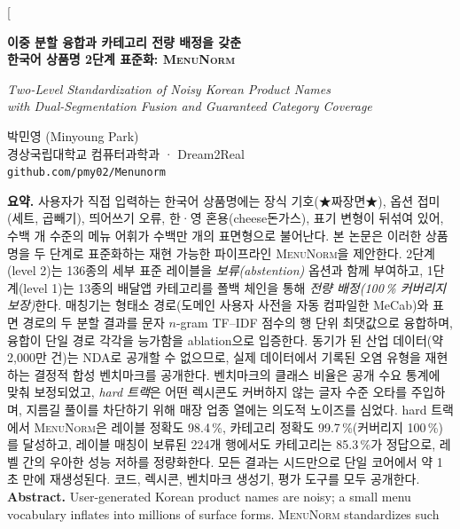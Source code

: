 \documentclass[10pt,twocolumn]{article}
\newcommand{\menunorm}{\textsc{MenuNorm}}
\begin{document}
\twocolumn[{%
\begin{center}
{\LARGE\bfseries 이중 분할 융합과 카테고리 전량 배정을 갖춘\\[2pt]
한국어 상품명 2단계 표준화: \menunorm\par}
\vspace{8pt}
{\large\itshape Two-Level Standardization of Noisy Korean Product Names\\
with Dual-Segmentation Fusion and Guaranteed Category Coverage\par}
\vspace{12pt}
{\large 박민영 (Minyoung Park)}\\[2pt]
{\small 경상국립대학교 컴퓨터과학과 \;·\; Dream2Real\\
\texttt{github.com/pmy02/Menunorm}}
\vspace{12pt}
\end{center}
\begin{center}
\begin{minipage}{0.92\textwidth}
\small
\textbf{요약.}
사용자가 직접 입력하는 한국어 상품명에는 장식 기호(\mbox{★짜장면★}),
옵션 접미(세트, 곱빼기), 띄어쓰기 오류, 한·영 혼용(\mbox{cheese돈가스}),
표기 변형이 뒤섞여 있어, 수백 개 수준의 메뉴 어휘가 수백만 개의 표면형으로
불어난다. 본 논문은 이러한 상품명을 두 단계로 표준화하는 재현 가능한
파이프라인 \menunorm{}을 제안한다. 2단계(level 2)는 136종의 세부 표준
레이블을 \emph{보류(abstention)} 옵션과 함께 부여하고, 1단계(level 1)는
13종의 배달앱 카테고리를 폴백 체인을 통해 \emph{전량 배정(100\,\% 커버리지
보장)}한다. 매칭기는 형태소 경로(도메인 사용자 사전을 자동 컴파일한
MeCab)와 표면 경로의 두 분할 결과를 문자 $n$-gram TF--IDF 점수의 행 단위
최댓값으로 융합하며, 융합이 단일 경로 각각을 능가함을 ablation으로
입증한다. 동기가 된 산업 데이터(약 2,000만 건)는 NDA로 공개할 수 없으므로,
실제 데이터에서 기록된 오염 유형을 재현하는 결정적 합성 벤치마크를
공개한다. 벤치마크의 클래스 비율은 공개 수요 통계에 맞춰 보정되었고,
\emph{hard 트랙}은 어떤 렉시콘도 커버하지 않는 글자 수준 오타를 주입하며,
지름길 풀이를 차단하기 위해 매장 업종 열에는 의도적 노이즈를 심었다. hard
트랙에서 \menunorm{}은 레이블 정확도 98.4\,\%, 카테고리 정확도
99.7\,\%(커버리지 100\,\%)를 달성하고, 레이블 매칭이 보류된 224개 행에서도
카테고리는 85.3\,\%가 정답으로, 레벨 간의 우아한 성능 저하를 정량화한다.
모든 결과는 시드만으로 단일 코어에서 약 1초 만에 재생성된다. 코드, 렉시콘,
벤치마크 생성기, 평가 도구를 모두 공개한다.\\[4pt]
\textbf{Abstract.}
User-generated Korean product names are noisy; a small menu vocabulary
inflates into millions of surface forms. \menunorm{} standardizes such

\end{minipage}
\end{center}}
\end{document}
